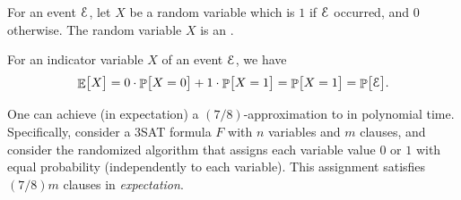 \begin{defn}
    For an event $\EuScript{E}$, let $X$ be a random variable which is $1$
    if $\EuScript{E}$ occurred, and $0$ otherwise. The random variable $X$
    is an .
\end{defn}

\begin{observation}
    For an indicator variable $X$ of an event $\EuScript{E}$, we have
    \begin{align*}
      \Ex{\bigl. X}%
      =%
      0 \cdot \Prob{\bigl.X = 0} + 1 \cdot \Prob{\bigl.X = 1}%
      =%
      \Prob{\bigl.X = 1}%
      =%
      \Prob{\bigl. \Event}.
    \end{align*}
\end{observation}


\begin{theorem}
    One can achieve (in expectation) a $(7/8)$-approximation to
     in polynomial time. Specifically, consider a
    $3$SAT formula $F$ with $n$ variables and $m$ clauses, and consider
    the randomized algorithm that assigns each variable value $0$ or $1$
    with equal probability (independently to each variable).  This
    assignment satisfies $(7/8)m$ clauses in \emph{expectation}.
\end{theorem}


